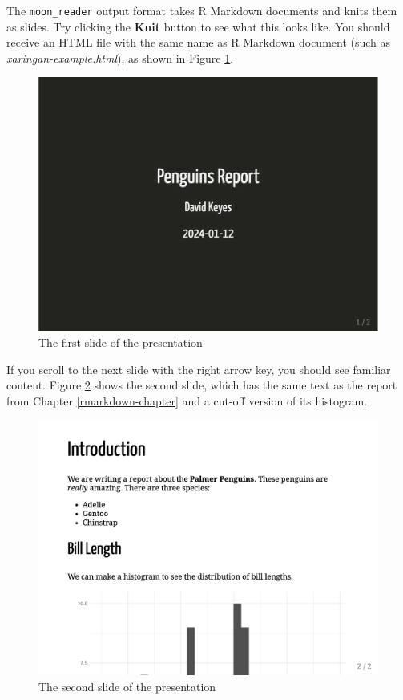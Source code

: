 \documentclass[
]{book}
\begin{document}
The \texttt{moon\_reader} output format takes R Markdown documents and knits them as slides. Try clicking the \textbf{Knit} button to see what this looks like. You should receive an HTML file with the same name as R Markdown document (such as \emph{xaringan-example.html}), as shown in Figure \ref{fig:penguins-report-slide-1}.

\begin{figure}
\includegraphics[width=1\linewidth]{assets/penguins-report-slide-1} \caption{The first slide of the presentation}\label{fig:penguins-report-slide-1}
\end{figure}

If you scroll to the next slide with the right arrow key, you should see familiar content. Figure \ref{fig:penguins-report-slide-2} shows the second slide, which has the same text as the report from Chapter \ref{rmarkdown-chapter} and a cut-off version of its histogram.

\begin{figure}
\includegraphics[width=1\linewidth]{assets/penguins-report-slide-2} \caption{The second slide of the presentation}\label{fig:penguins-report-slide-2}
\end{figure}
\end{document}
